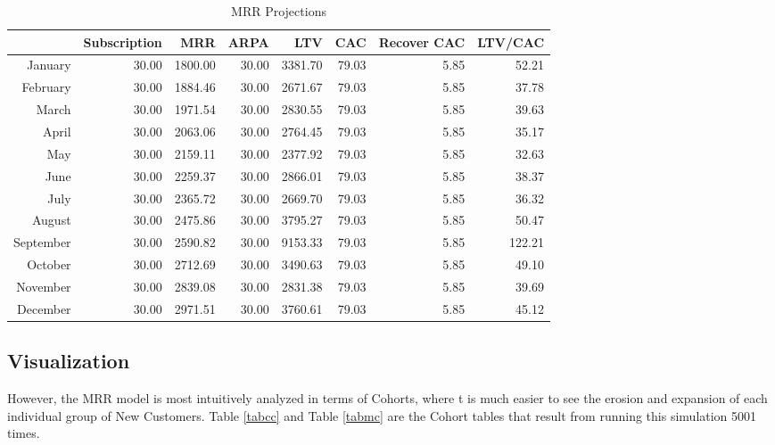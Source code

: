\documentclass[11pt]{article}
\begin{document}
\begin{table}[ht]
\centering
\begin{tabularx}{\textwidth}{rrrrrrrr}
  \hline
 & Subscription & MRR & ARPA & LTV & CAC & Recover CAC & LTV/CAC \\ 
  \hline
January & 30.00 & 1800.00 & 30.00 & 3381.70 & 79.03 & 5.85 & 52.21 \\ 
  February & 30.00 & 1884.46 & 30.00 & 2671.67 & 79.03 & 5.85 & 37.78 \\ 
  March & 30.00 & 1971.54 & 30.00 & 2830.55 & 79.03 & 5.85 & 39.63 \\ 
  April & 30.00 & 2063.06 & 30.00 & 2764.45 & 79.03 & 5.85 & 35.17 \\ 
  May & 30.00 & 2159.11 & 30.00 & 2377.92 & 79.03 & 5.85 & 32.63 \\ 
  June & 30.00 & 2259.37 & 30.00 & 2866.01 & 79.03 & 5.85 & 38.37 \\ 
  July & 30.00 & 2365.72 & 30.00 & 2669.70 & 79.03 & 5.85 & 36.32 \\ 
  August & 30.00 & 2475.86 & 30.00 & 3795.27 & 79.03 & 5.85 & 50.47 \\ 
  September & 30.00 & 2590.82 & 30.00 & 9153.33 & 79.03 & 5.85 & 122.21 \\ 
  October & 30.00 & 2712.69 & 30.00 & 3490.63 & 79.03 & 5.85 & 49.10 \\ 
  November & 30.00 & 2839.08 & 30.00 & 2831.38 & 79.03 & 5.85 & 39.69 \\ 
  December & 30.00 & 2971.51 & 30.00 & 3760.61 & 79.03 & 5.85 & 45.12 \\ 
   \hline
\end{tabularx}
\caption{MRR Projections} 
\label{tabmp}
\end{table}




\newpage
\subsection*{Visualization}



However, the MRR model is most intuitively analyzed in terms of Cohorts, where t is much easier to see the erosion and expansion of each individual group of New Customers. Table \ref{tabcc} and  Table \ref{tabmc} are the Cohort tables that result from running this simulation 5001 times. 
\end{document}
